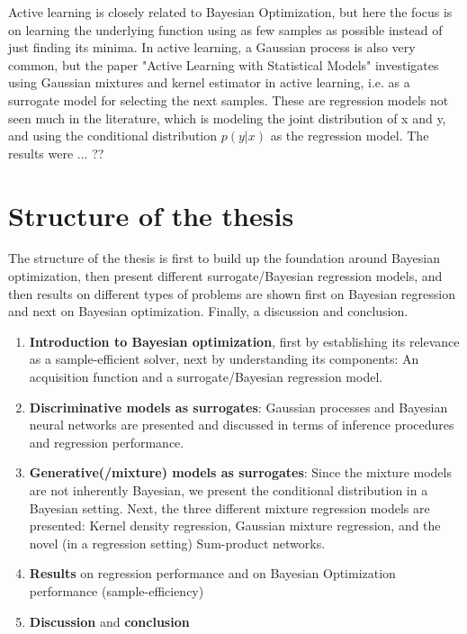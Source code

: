 Active learning is closely related to Bayesian Optimization, but here the focus is on learning the
underlying function using as few samples as possible instead of just finding its minima. In active
learning, a Gaussian process is also very common, but the paper "Active Learning with Statistical
Models" \cite{ALStatisticalModels} investigates using Gaussian mixtures and kernel estimator in
active learning, i.e. as a surrogate model for selecting the next samples. These are regression
models not seen much in the literature, which is modeling the joint distribution of x and y, and
using the conditional distribution $p(y|x)$ as the regression model. The results were ... ??

\section{Structure of the thesis}
The structure of the thesis is first to build up the foundation around Bayesian optimization, then
present different surrogate/Bayesian regression models, and then results on different types of
problems are shown first on Bayesian regression and next on Bayesian optimization. Finally, a discussion and conclusion. 

\begin{enumerate}[noitemsep]
    \item \textbf{Introduction to Bayesian optimization}, first by establishing its relevance as a
    sample-efficient solver, next by understanding its components: An acquisition function and a 
    surrogate/Bayesian regression model.
    \item \textbf{Discriminative models as surrogates}: Gaussian processes and Bayesian neural
    networks are presented and discussed in terms of inference procedures and regression performance. 
    \item \textbf{Generative(/mixture) models as surrogates}: Since the mixture models are not 
    inherently Bayesian, we present the conditional distribution in a Bayesian setting. 
    Next, the three different mixture regression models are presented: Kernel density regression, Gaussian mixture regression,
    and the novel (in a regression setting) Sum-product networks.
    \item \textbf{Results} on regression performance and on Bayesian Optimization performance (sample-efficiency)
    \item \textbf{Discussion} and \textbf{conclusion}
\end{enumerate}

